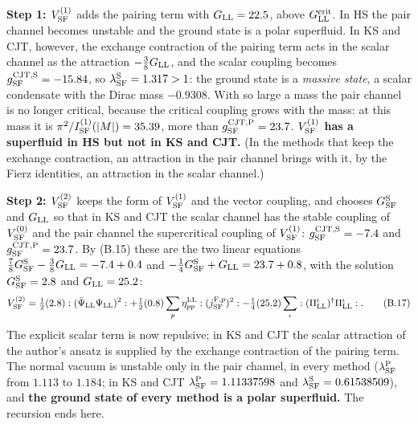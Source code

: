 \documentclass[
  10pt,
]{article}
\begin{document}
\textbf{Step 1: \(V^{(1)}_{\rm SF}\)} adds the pairing term with
\(G_{\rm LL}=22.5\), above \(G^{\rm crit}_{\rm LL}\). In HS the pair
channel becomes unstable and the ground state is a polar superfluid. In
KS and CJT, however, the exchange contraction of the pairing term acts
in the scalar channel as the attraction \(-\tfrac38G_{\rm LL}\), and the
scalar coupling becomes \(g^{{\rm CJT},{\rm S}}_{\rm SF}=-15.84\), so
\(\lambda^{\rm S}_{\rm SF}=1.317>1\): the ground state is a
\emph{massive state}, a scalar condensate with the Dirac mass
\(-0.9308\). With so large a mass the pair channel is no longer
critical, because the critical coupling grows with the mass: at this
mass it is \(\pi^2/I^{(1)}_{\rm SF}(|M|)=35.39\), more than
\(g^{{\rm CJT},{\rm P}}_{\rm SF}=23.7\). \textbf{\(V^{(1)}_{\rm SF}\)
has a superfluid in HS but not in KS and CJT.} (In the methods that keep
the exchange contraction, an attraction in the pair channel brings with
it, by the Fierz identities, an attraction in the scalar channel.)

\textbf{Step 2: \(V^{(2)}_{\rm SF}\)} keeps the form of
\(V^{(1)}_{\rm SF}\) and the vector coupling, and chooses
\(G^{\rm S}_{\rm SF}\) and \(G_{\rm LL}\) so that in KS and CJT the
scalar channel has the stable coupling of \(V^{(0)}_{\rm SF}\) and the
pair channel the supercritical coupling of \(V^{(1)}_{\rm SF}\):
\(g^{{\rm CJT},{\rm S}}_{\rm SF}=-7.4\) and
\(g^{{\rm CJT},{\rm P}}_{\rm SF}=23.7\). By (B.15) these are the two
linear equations
\(\tfrac78G^{\rm S}_{\rm SF}-\tfrac38G_{\rm LL}=-7.4+0.4\) and
\(-\tfrac14G^{\rm S}_{\rm SF}+G_{\rm LL}=23.7+0.8\), with the solution
\(G^{\rm S}_{\rm SF}=2.8\) and \(G_{\rm LL}=25.2\):
\[V^{(2)}_{\rm SF}=\tfrac12(2.8):(\bar\Psi_{\rm LL}\Psi_{\rm LL})^2:+\tfrac12(0.8)\sum_p\eta^{\rm LL}_{pp}:(j^{{\rm F},p}_{\rm SF})^2:-\tfrac14(25.2)\sum_\iota:(\Pi^\iota_{\rm LL})^\dagger\Pi^\iota_{\rm LL}:.\tag{B.17}\]
The explicit scalar term is now repulsive; in KS and CJT the scalar
attraction of the author's ansatz is supplied by the exchange
contraction of the pairing term. The normal vacuum is unstable only in
the pair channel, in every method (\(\lambda^{\rm P}_{\rm SF}\) from
\(1.113\) to \(1.184\); in KS and CJT
\(\lambda^{\rm P}_{\rm SF}=1.11337598\) and
\(\lambda^{\rm S}_{\rm SF}=0.61538509\)), and \textbf{the ground state
of every method is a polar superfluid.} The recursion ends here.
\end{document}
